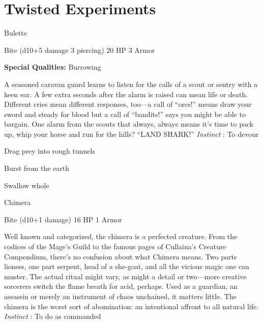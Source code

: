\chapter{Twisted Experiments}
   
 


\startMonsterName
Bulette	 
\stopMonsterName
 

Bite (d10+5 damage 3 piercing)	20 HP	3 Armor

 


 
\startMonsterQualities
{\bf Special Qualities:}  Burrowing
\stopMonsterQualities
 
\startMonsterDescription
A seasoned caravan guard learns to listen for the calls of a scout or sentry with a keen ear. A few extra seconds after the alarm is raised can mean life or death. Different cries mean different responses, too—a call of “orcs!” means draw your sword and steady for blood but a call of “bandits!” says you might be able to bargain. One alarm from the scouts that always, always means it’s time to pack up, whip your horse and run for the hills? “LAND SHARK!” {\em Instinct} : To devour
\stopMonsterDescription
 
\startitemize[1,packed]

\item Drag prey into rough tunnels

 
\item Burst from the earth

 
\item Swallow whole


\stopitemize
 
\startMonsterName
Chimera	 
\stopMonsterName
 

Bite (d10+1 damage)	16 HP	1 Armor

 


 
\startMonsterDescription
Well known and categorized, the chimera is a perfected creature. From the codices of the Mage’s Guild to the famous pages of Cullaina’s Creature Compendium, there’s no confusion about what Chimera means. Two parts lioness, one part serpent, head of a she-goat, and all the vicious magic one can muster. The actual ritual might vary, as might a detail or two—more creative sorcerers switch the flame breath for acid, perhaps. Used as a guardian, an assassin or merely an instrument of chaos unchained, it matters little. The chimera is the worst sort of abomination: an intentional affront to all natural life. {\em Instinct} : To do as commanded
\stopMonsterDescription
 
